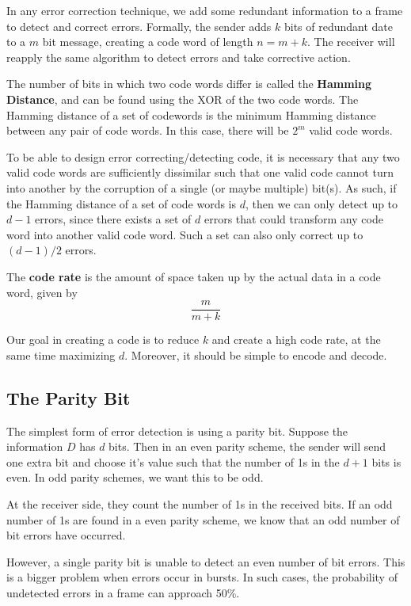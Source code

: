 \documentclass[12pt,letterpaper]{book}
\theoremstyle{definition}
\begin{document}
In any error correction technique, we add some redundant information to a frame to detect and correct errors. Formally, the sender adds $k$ bits of redundant date to a $m$ bit message, creating a code word of length $n=m+k$. The receiver will reapply the same algorithm to detect errors and take corrective action.

The number of bits in which two code words differ is called the \textbf{Hamming Distance}, and can be found using the XOR of the two code words. The Hamming distance of a set of codewords is the minimum Hamming distance between any pair of code words. In this case, there will be $2^m$ valid code words.

To be able to design error correcting/detecting code, it is necessary that any two valid code words are sufficiently dissimilar such that one valid code cannot turn into another by the corruption of a single (or maybe multiple) bit(s). As such, if the Hamming distance of a set of code words is $d$, then we can only detect up to $d-1$ errors, since there exists a set of $d$ errors that could transform any code word into another valid code word. Such a set can also only correct up to $(d-1)/2$ errors.

The \textbf{code rate} is the amount of space taken up by the actual data in a code word, given by
\[\frac{m}{m+k}\]

Our goal in creating a code is to reduce $k$ and create a high code rate, at the same time maximizing $d$. Moreover, it should be simple to encode and decode.

\subsection{The Parity Bit}

The simplest form of error detection is using a parity bit. Suppose the information $D$  has $d$ bits. Then in an even parity scheme, the sender will send one extra bit and choose it's value such that the number of 1s in the $d+1$ bits is even. In odd parity schemes, we want this to be odd.

At the receiver side, they count the number of 1s in the received bits. If an odd number of 1s are found in a even parity scheme, we know that an odd number of bit errors have occurred.

However, a single parity bit is unable to detect an even number of bit errors. This is a bigger problem when errors occur in bursts. In such cases, the probability of undetected errors in a frame can approach 50\%.
\end{document}
